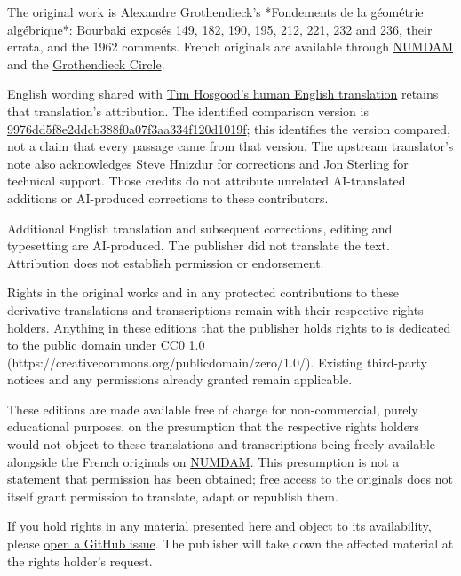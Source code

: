 \begingroup\small
The original work is Alexandre Grothendieck’s *Fondements de la géométrie algébrique*: Bourbaki exposés 149, 182, 190, 195, 212, 221, 232 and 236, their errata, and the 1962 comments. French originals are available through \href{https://www.numdam.org/}{NUMDAM} and the \href{https://webusers.imj-prg.fr/~leila.schneps/grothendieckcircle/FGA.pdf}{Grothendieck Circle}.

English wording shared with \href{https://github.com/thosgood/fga}{Tim Hosgood’s human English translation} retains that translation’s attribution. The identified comparison version is \href{https://github.com/thosgood/fga/tree/9976dd5f8e2ddcb388f0a07f3aa334f120d1019f}{9976dd5f8e2ddcb388f0a07f3aa334f120d1019f}; this identifies the version compared, not a claim that every passage came from that version. The upstream translator’s note also acknowledges Steve Hnizdur for corrections and Jon Sterling for technical support. Those credits do not attribute unrelated AI-translated additions or AI-produced corrections to these contributors.

Additional English translation and subsequent corrections, editing and typesetting are AI-produced. The publisher did not translate the text. Attribution does not establish permission or endorsement.

Rights in the original works and in any protected contributions to these derivative translations and transcriptions remain with their respective rights holders. Anything in these editions that the publisher holds rights to is dedicated to the public domain under CC0 1.0 (https://creativecommons.org/publicdomain/zero/1.0/). Existing third-party notices and any permissions already granted remain applicable.

These editions are made available free of charge for non-commercial, purely educational purposes, on the presumption that the respective rights holders would not object to these translations and transcriptions being freely available alongside the French originals on \href{https://www.numdam.org/journals/PMIHES/}{NUMDAM}. This presumption is not a statement that permission has been obtained; free access to the originals does not itself grant permission to translate, adapt or republish them.

If you hold rights in any material presented here and object to its availability, please \href{https://github.com/KokunoYumeto/fga-en/issues}{open a GitHub issue}. The publisher will take down the affected material at the rights holder's request.

\par\endgroup\clearpage
